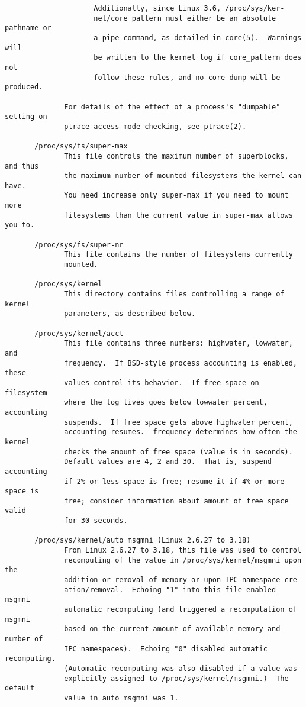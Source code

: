 \documentclass[]{article}
\begin{document}
\begin{verbatim}
                     Additionally, since Linux 3.6, /proc/sys/ker‐
                     nel/core_pattern must either be an absolute pathname or
                     a pipe command, as detailed in core(5).  Warnings will
                     be written to the kernel log if core_pattern does not
                     follow these rules, and no core dump will be produced.

              For details of the effect of a process's "dumpable" setting on
              ptrace access mode checking, see ptrace(2).

       /proc/sys/fs/super-max
              This file controls the maximum number of superblocks, and thus
              the maximum number of mounted filesystems the kernel can have.
              You need increase only super-max if you need to mount more
              filesystems than the current value in super-max allows you to.

       /proc/sys/fs/super-nr
              This file contains the number of filesystems currently
              mounted.

       /proc/sys/kernel
              This directory contains files controlling a range of kernel
              parameters, as described below.

       /proc/sys/kernel/acct
              This file contains three numbers: highwater, lowwater, and
              frequency.  If BSD-style process accounting is enabled, these
              values control its behavior.  If free space on filesystem
              where the log lives goes below lowwater percent, accounting
              suspends.  If free space gets above highwater percent,
              accounting resumes.  frequency determines how often the kernel
              checks the amount of free space (value is in seconds).
              Default values are 4, 2 and 30.  That is, suspend accounting
              if 2% or less space is free; resume it if 4% or more space is
              free; consider information about amount of free space valid
              for 30 seconds.

       /proc/sys/kernel/auto_msgmni (Linux 2.6.27 to 3.18)
              From Linux 2.6.27 to 3.18, this file was used to control
              recomputing of the value in /proc/sys/kernel/msgmni upon the
              addition or removal of memory or upon IPC namespace cre‐
              ation/removal.  Echoing "1" into this file enabled msgmni
              automatic recomputing (and triggered a recomputation of msgmni
              based on the current amount of available memory and number of
              IPC namespaces).  Echoing "0" disabled automatic recomputing.
              (Automatic recomputing was also disabled if a value was
              explicitly assigned to /proc/sys/kernel/msgmni.)  The default
              value in auto_msgmni was 1.


\end{verbatim}
\end{document}

